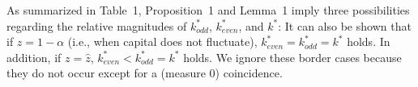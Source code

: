 \documentclass[nogrid]{MBE}%
\begin{document}
{%

As summarized in Table~1, Proposition~1 and Lemma~1 imply three possibilities regarding the
relative magnitudes of $k_{odd}^{\ast}$, $k_{even}^{\ast}$, and \noindent$k^{\ast}$: {It can also
be shown that if $z=1-\alpha$ (i.e., when capital does not fluctuate),
$k_{even}^{\ast}=k_{odd}^{\ast}=k^{\ast}$
holds. In addition, if $z=\widehat z$, $k_{even}^{\ast}<k_{odd}^{\ast}%
=k^{\ast}$ holds. We ignore these border cases because they do not occur
except for a (measure 0) coincidence.}


}
\end{document}
